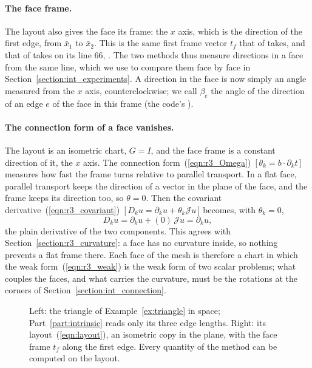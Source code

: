 \paragraph{The face frame.} The layout also gives the face its frame: the $x$ axis, which is the direction of the first edge, from $\bar x_1$ to $\bar x_2$. This is the same first frame vector $t_f$ that  of  takes, and that  of  takes on its line 66, . The two methods thus measure directions in a face from the same line, which we use to compare them face by face in Section~\ref{section:int_experiments}. A direction in the face is now simply an angle measured from the $x$ axis, counterclockwise; we call $\beta_e$ the angle of the direction of an edge $e$ of the face in this frame (the code's ).

\paragraph{The connection form of a face vanishes.} The layout is an isometric chart, $G = I$, and the face frame is a constant direction of it, the $x$ axis. The connection form~(\ref{eqn:r3_Omega})~[\,$\theta_k = b\cdot\partial_kt$\,] measures how fast the frame turns relative to parallel transport. In a flat face, parallel transport keeps the direction of a vector in the plane of the face, and the frame keeps its direction too, so $\theta = 0$. Then the covariant derivative~(\ref{eqn:r3_covariant})~[\,$D_ku = \partial_ku + \theta_k\mathcal Ju$\,] becomes, with $\theta_k = 0$,
\begin{equation*}
D_ku = \partial_ku + (0)\,\mathcal Ju = \partial_ku ,
\end{equation*}
the plain derivative of the two components. This agrees with Section~\ref{section:r3_curvature}: a face has no curvature inside, so nothing prevents a flat frame there. Each face of the mesh is therefore a chart in which the weak form~(\ref{eqn:r3_weak}) is the weak form of two scalar problems; what couples the faces, and what carries the curvature, must be the rotations at the corners of Section~\ref{section:int_connection}.
\begin{figure}[t]
\centering
{}\hfill
{}
\caption{Left: the triangle of Example~\ref{ex:triangle} in space; Part~\ref{part:intrinsic} reads only its three edge lengths. Right: its layout~(\ref{eqn:layout}), an isometric copy in the plane, with the face frame $t_f$ along the first edge. Every quantity of the method can be computed on the layout.}
\label{fig:layout}
\end{figure}

